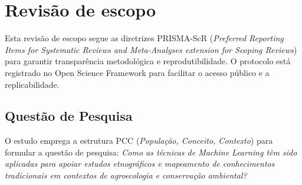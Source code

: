 \section{Revisão de escopo}

Esta revisão de escopo segue as diretrizes PRISMA-ScR (\textit{Preferred Reporting Items for Systematic Reviews and Meta-Analyses extension for Scoping Reviews}) para garantir transparência metodológica e reprodutibilidade. O protocolo está registrado no Open Science Framework para facilitar o acesso público e a replicabilidade.

\subsection{Questão de Pesquisa}

O estudo emprega a estrutura PCC (\textit{População, Conceito, Contexto}) para formular a questão de pesquisa: \textit{Como as técnicas de Machine Learning têm sido aplicadas para apoiar estudos etnográficos e mapeamento de conhecimentos tradicionais em contextos de agroecologia e conservação ambiental?}

\begin{table}[H]
  \centering
  \caption{Estrutura da revisão de escopo de acordo com a estrutura PCC}
  \label{tab:pcc}
\end{table}

